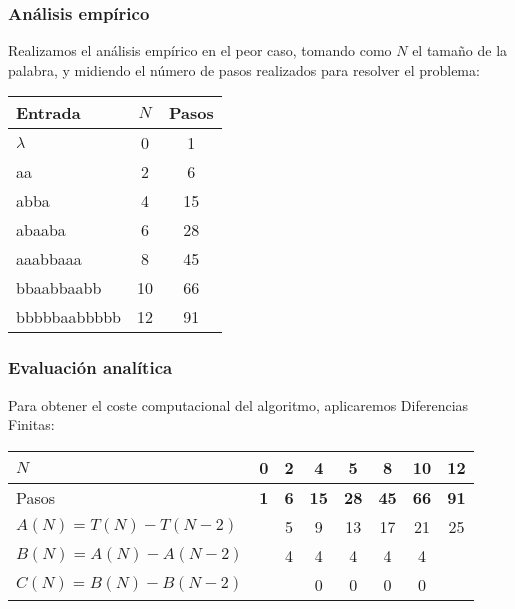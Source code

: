 \subsubsection*{Análisis empírico}

Realizamos el análisis empírico en el peor caso, tomando como $N$ el tamaño de la palabra, y midiendo el número de pasos realizados para resolver el problema:

\begin{table}[h]
    \centering
    \begin{tabular}{lcc}
        Entrada & $N$ & Pasos \\
        \hline
        $\lambda$      & 0  & 1  \\
        aa             & 2  & 6  \\
        abba           & 4  & 15 \\
        abaaba         & 6  & 28 \\
        aaabbaaa       & 8  & 45 \\
        bbaabbaabb     & 10 & 66 \\
        bbbbbaabbbbb   & 12 & 91
    \end{tabular}
\end{table}


\subsubsection*{Evaluación analítica}
Para obtener el coste computacional del algoritmo, aplicaremos Diferencias Finitas:

\begin{table}[h]
    \centering
    \begin{tabular}{|l|c|c|c|c|c|c|c|}
        \hline
        $N$ & \textbf{0} & \textbf{2} & \textbf{4} & \textbf{5} & \textbf{8} & \textbf{10} & \textbf{12} \\ \hline
        Pasos & \textbf{1} & \textbf{6} & \textbf{15} & \textbf{28} & \textbf{45} & \textbf{66} & \textbf{91} \\ \hline
        \hline
        $A(N) = T(N) - T(N-2)$ &    &  5 &  9 & 13 & 17 & 21 & 25 \\ \hline
        $B(N) = A(N) - A(N-2)$ &    &  4 &  4 &  4 &  4 &  4 &    \\ \hline
        $C(N) = B(N) - B(N-2)$ &    &    &  0 &  0 &  0 &  0 &    \\ \hline
    \end{tabular}
\end{table}

